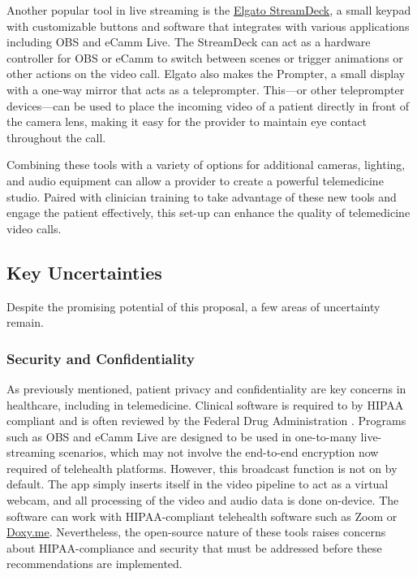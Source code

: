 \documentclass[utf8]{FrontiersinHarvard} %
\begin{document}
Another popular tool in live streaming is the \href{https://www.elgato.com/us/en/s/explore-stream-deck}{Elgato StreamDeck}, a small keypad with customizable buttons and software that integrates with various applications including OBS and eCamm Live. The StreamDeck can act as a hardware controller for OBS or eCamm to switch between scenes or trigger animations or other actions on the video call. Elgato also makes the Prompter, a small display with a one-way mirror that acts as a teleprompter. This---or other teleprompter devices---can be used to place the incoming video of a patient directly in front of the camera lens, making it easy for the provider to maintain eye contact throughout the call.

Combining these tools with a variety of options for additional cameras, lighting, and audio equipment can allow a provider to create a powerful telemedicine studio. Paired with clinician training to take advantage of these new tools and engage the patient effectively, this set-up can enhance the quality of telemedicine video calls.

\subsection{Key Uncertainties}

Despite the promising potential of this proposal, a few areas of uncertainty remain.

\subsubsection{Security and Confidentiality}

As previously mentioned, patient privacy and confidentiality are key concerns in healthcare, including in telemedicine. Clinical software is required to by HIPAA compliant and is often reviewed by the Federal Drug Administration \citep{jinTelemedicineCurrentImpact2020}. Programs such as OBS and eCamm Live are designed to be used in one-to-many live-streaming scenarios, which may not involve the end-to-end encryption now required of telehealth platforms. However, this broadcast function is not on by default. The app simply inserts itself in the video pipeline to act as a virtual webcam, and all processing of the video and audio data is done on-device. The software can work with HIPAA-compliant telehealth software such as Zoom or \href{http://Doxy.me}{Doxy.me}. Nevertheless, the open-source nature of these tools raises concerns about HIPAA-compliance and security that must be addressed before these recommendations are implemented.
\end{document}

